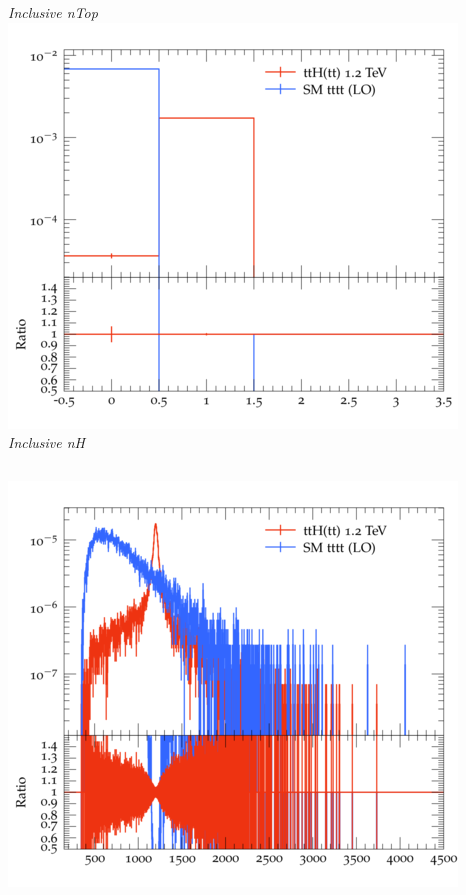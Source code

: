 \documentclass{beamer}
\begin{document}
\begin{frame}
\begin{columns}
\textit{\small Inclusive nTop}
\includegraphics[width=\textwidth]{../plots/ttH_1200/tttt_ttH/Inclusive_nH.png}\\
\textit{\small Inclusive nH}
\end{columns}
\begin{columns}
\includegraphics[width=\textwidth]{../plots/ttH_1200/tttt_ttH/Inclusive_InvM_ttbar12.png}\\

\end{columns}
\end{frame}
\end{document}

